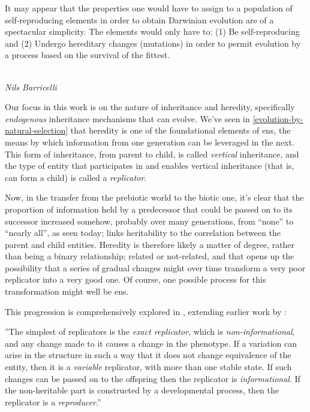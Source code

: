 \epigraph{%
It may appear that the properties one would have to assign to a population of self-reproducing elements in order to obtain Darwinian evolution are of a spectacular simplicity. The elements would only have to: (1) Be self-reproducing and (2) Undergo hereditary changes (mutations) in order to permit evolution by a process based on the survival of the fittest.}%
{\textit{\\Nils Barricelli}}

Our focus in this work is on the nature of inheritance and heredity, specifically \emph{endogenous} inheritance mechanisms that can evolve. We’ve seen in \cref{evolution-by-natural-selection} that heredity is one of the foundational elements of \gls{ens}, the means by which information from one generation can be leveraged in the next. This form of inheritance, from parent to child, is called \emph{vertical} inheritance, and the type of entity that participates in and enables vertical inheritance (that is, can form a child) is called a \emph{replicator}. 

Now, in the transfer from the prebiotic world to the biotic one, it’s clear that the proportion of information held by a predecessor that could be passed on to its successor increased somehow, probably over many generations, from ``none'' to ``nearly all'', as seen today; \textcite{Vasas2012a} links heritability to the correlation between the parent and child entities. Heredity is therefore likely a matter of degree, rather than being a binary relationship; related or not-related, and that opens up the possibility that a series of gradual changes might over time transform a very poor replicator into a very good one. Of course, one possible process for this transformation might well be \gls{ens}.

This progression is comprehensively explored in \textcite{Zachar2010}, extending earlier work by \textcite{Szathmary1999,Szathmary:2006ty}: 

''The simplest of replicators is the \emph{exact replicator}, which is \emph{non-informational}, and any change made to it causes a change in the phenotype. If a variation can arise in the structure in such a way that it does not change equivalence of the entity, then it is a \emph{variable} replicator, with more than one stable state. If such changes can be passed on to the offspring then the replicator is \emph{informational}. If the non-heritable part is constructed by a developmental process, then the replicator is a \emph{reproducer}.'' \parencite[p.21]{Zachar2010}

